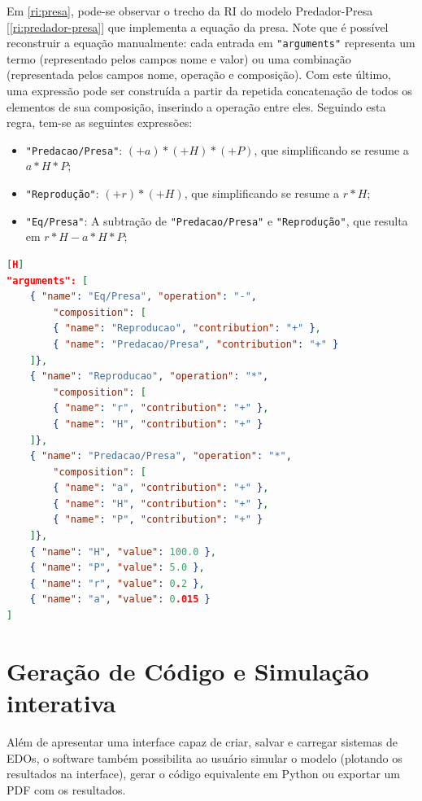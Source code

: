 \documentclass[
	12pt,				%
	openright,			%
	oneside,			%
	a4paper,			%
	main=brazil,
	english,			%
	]{ufsj-abntex2}
\begin{document}
Em \ref{ri:presa}, pode-se observar o trecho da RI do modelo Predador-Presa [\ref{ri:predador-presa}] que implementa a equação da presa. Note que é possível reconstruir a equação manualmente: cada entrada em \texttt{"arguments"} representa um termo (representado pelos campos nome e valor) ou uma combinação (representada pelos campos nome, operação e composição). Com este último, uma expressão pode ser construída a partir da repetida concatenação de todos os elementos de sua composição, inserindo a operação entre eles. Seguindo esta regra, tem-se as seguintes expressões:

\begin{itemize}
    \item \texttt{"Predacao/Presa"}: \((+a)*(+H)*(+P)\), que simplificando se resume a \(a*H*P\);
    \item \texttt{"Reprodução"}: \((+r)*(+H)\), que simplificando se resume a \(r*H\);
    \item \texttt{"Eq/Presa"}: A subtração de \texttt{"Predacao/Presa"} e \texttt{"Reprodução"}, que resulta em \(r*H-a*H*P\);
\end{itemize}

\begin{lstlisting}[language=json, label=ri:presa, caption=Trecho da RI que define termos e combinações usadas para definir a equação da presa.][H]
"arguments": [
    { "name": "Eq/Presa", "operation": "-",
        "composition": [
        { "name": "Reproducao", "contribution": "+" },
        { "name": "Predacao/Presa", "contribution": "+" }
    ]},
    { "name": "Reproducao", "operation": "*",
        "composition": [
        { "name": "r", "contribution": "+" },
        { "name": "H", "contribution": "+" }
    ]},
    { "name": "Predacao/Presa", "operation": "*",
        "composition": [
        { "name": "a", "contribution": "+" },
        { "name": "H", "contribution": "+" },
        { "name": "P", "contribution": "+" }
    ]},
    { "name": "H", "value": 100.0 },
    { "name": "P", "value": 5.0 },
    { "name": "r", "value": 0.2 },
    { "name": "a", "value": 0.015 }
]
\end{lstlisting}

\section{Geração de Código e Simulação interativa}

Além de apresentar uma interface capaz de criar, salvar e carregar sistemas de EDOs, o software também possibilita ao usuário simular o modelo (plotando os resultados na interface), gerar o código equivalente em Python ou exportar um PDF com os resultados.
\end{document}
